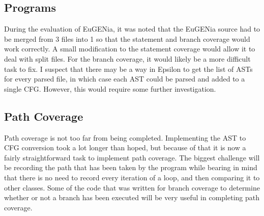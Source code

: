 \subsection{Programs}

During the evaluation of EuGENia, it was noted that the EuGENia source had to be merged from 3 files into 1 so that the statement and branch coverage would work correctly. A small modification to the statement coverage would allow it to deal with split files. For the branch coverage, it would likely be a more difficult task to fix. I suspect that there may be a way in Epsilon to get the list of ASTs for every parsed file, in which case each AST could be parsed and added to a single CFG. However, this would require some further investigation.

\subsection{Path Coverage}

Path coverage is not too far from being completed. Implementing the AST to CFG conversion took a lot longer than hoped, but because of that it is now a fairly straightforward task to implement path coverage. The biggest challenge will be recording the path that has been taken by the program while bearing in mind that there is no need to record every iteration of a loop, and then comparing it to other classes. Some of the code that was written for branch coverage to determine whether or not a branch has been executed will be very useful in completing path coverage.